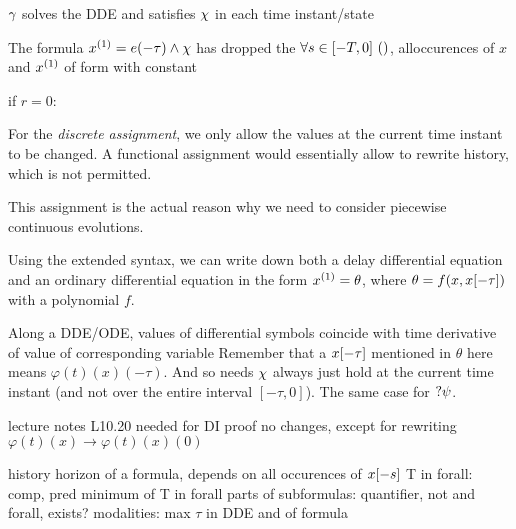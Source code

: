     $\gamma_{}$ solves the DDE and satisfies $\chi$ in each time instant/state

    The formula $\hevolve{\D{x}=\astrm(-\tau)}\land\ivr$ has dropped the $\forall s\in[-T,0]{\,} \left(\right)$, alloccurences of $x$ and $\D{x}$ of form with constant

    if $r=0$: 

    For the \emph{discrete assignment}, we only allow the values at the current time instant to be changed. A functional assignment would essentially allow to rewrite history, which is not permitted.

    This assignment is the actual reason why we need to consider piecewise continuous evolutions.

    


    Using the extended syntax, we can write down both a delay differential equation and an ordinary differential equation in the form $\D{x}=\theta$, where $\theta=f(x,x[-\tau])$ with a polynomial $f$.

    Along a DDE/ODE, values of differential symbols coincide with time derivative of value of corresponding variable
    Remember that a $x[-\tau]$ mentioned in $\theta$ here means $\varphi(t)(x)(-\tau)$.
    And so needs $\chi$ always just hold at the current time instant (and not over the entire interval $[-\tau,0]$). The same case for $?\psi$.

    \begin{lemma}
        lecture notes L10.20
        needed for DI proof
        no changes, except for rewriting $\varphi(t)(x)\rightarrow\varphi(t)(x)(0)$
    \end{lemma}


    \begin{definition}
        history horizon of a \ddL formula, depends on all occurences of $x[-s]$
        T in forall: comp, pred
        minimum of T in forall parts of subformulas: quantifier, not and
        forall, exists?
        modalities: max $\tau$ in DDE and of formula
    \end{definition}

